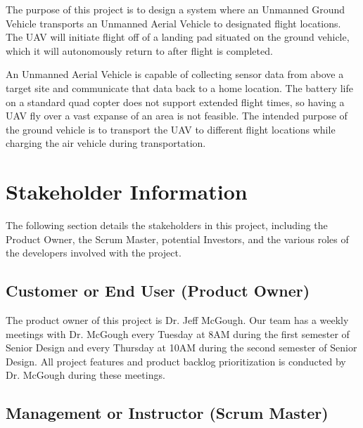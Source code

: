 The purpose of this project is to design a system where an Unmanned Ground Vehicle transports an Unmanned Aerial Vehicle to designated flight locations. The UAV will initiate flight off of a landing pad situated on the ground vehicle, which it will autonomously return to after flight is completed.

An Unmanned Aerial Vehicle is capable of collecting sensor data from above a target site and communicate that data back to a home location. The battery life on a standard quad copter does not support extended flight times, so having a UAV fly over a vast expanse of an area is not feasible. The intended purpose of the ground vehicle is to transport the UAV to different flight locations while charging the air vehicle during transportation.

\section{ Stakeholder Information}

The following section details the stakeholders in this project, including the Product Owner, the Scrum Master, potential Investors, and the various roles of the developers involved with the project.


\subsection{Customer or End User (Product Owner)}

The product owner of this project is Dr. Jeff McGough. Our team has a weekly meetings with Dr. McGough every Tuesday at 8AM during the first semester of Senior Design and every Thursday at 10AM during the second semester of Senior Design. All project features and product backlog prioritization is conducted by Dr. McGough during these meetings.


\subsection{Management or Instructor (Scrum Master)}

